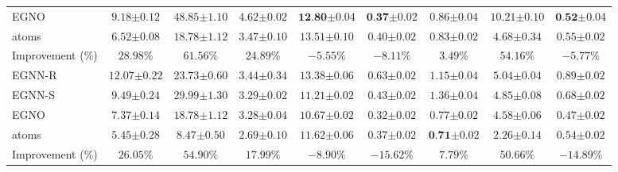 \begin{table}[ht]
{\begin{tabular}{lcccccccc}
        EGNO \cite{xu_equivariant_2024} & \(9.18{\scriptstyle \pm0.12}\) & \(48.85{\scriptstyle \pm1.10}\) & \(4.62{\scriptstyle \pm0.02}\) & \(\textbf{12.80}{\scriptstyle \pm0.04}\) & \(\textbf{0.37}{\scriptstyle \pm0.02}\) & \(0.86{\scriptstyle \pm0.04}\) & \(10.21{\scriptstyle \pm0.10}\) & \(\textbf{0.52}{\scriptstyle \pm0.04}\) \\
        \gls{atoms} & \(\mathbf{6.52}{\scriptstyle \pm0.08}\) & \(\mathbf{18.78}{\scriptstyle \pm1.12}\) & \(\mathbf{3.47}{\scriptstyle \pm0.10}\) & \(13.51{\scriptstyle \pm0.10}\) & \(0.40{\scriptstyle \pm0.02}\) & \(\mathbf{0.83}{\scriptstyle \pm0.02}\) & \(\mathbf{4.68}{\scriptstyle \pm0.34}\) & \(0.55{\scriptstyle \pm0.02}\) \\
        \midrule
        \rowcolor{gray!20} Improvement (\%) & \(28.98\%\) & \(61.56\%\) & \(24.89\%\) & \(-5.55\%\) & \(-8.11\%\) & \(3.49\%\) & \(54.16\%\) & \(-5.77\%\) \\
        \midrule
    
        EGNN-R & \(12.07{\scriptstyle \pm0.22}\) & \(23.73{\scriptstyle \pm0.60}\) & \(3.44{\scriptstyle \pm0.34}\) & \(13.38{\scriptstyle \pm0.06}\) & \(0.63{\scriptstyle \pm0.02}\) & \(1.15{\scriptstyle \pm0.04}\) & \(5.04{\scriptstyle \pm0.04}\) & \(0.89{\scriptstyle \pm0.02}\) \\
        EGNN-S & \(9.49{\scriptstyle \pm0.24}\) & \(29.99{\scriptstyle \pm1.30}\) & \(3.29{\scriptstyle \pm0.02}\) & \(11.21{\scriptstyle \pm0.02}\) & \(0.43{\scriptstyle \pm0.02}\) & \(1.36{\scriptstyle \pm0.04}\) & \(4.85{\scriptstyle \pm0.08}\) & \(0.68{\scriptstyle \pm0.02}\) \\
        
    
        EGNO & \(7.37{\scriptstyle \pm0.14}\) & \(18.78{\scriptstyle \pm1.12}\) & \(3.28{\scriptstyle \pm0.04}\) & \(\mathbf{10.67}{\scriptstyle \pm0.02}\) & \(\mathbf{0.32}{\scriptstyle \pm0.02}\) & \(0.77{\scriptstyle \pm0.02}\) & \(4.58{\scriptstyle \pm0.06}\) & \(\mathbf{0.47}{\scriptstyle \pm0.02}\) \\
        \gls{atoms} & \(\mathbf{5.45}{\scriptstyle \pm0.28}\) & \(\mathbf{8.47}{\scriptstyle \pm0.50}\) & \(\mathbf{2.69}{\scriptstyle \pm0.10}\) & \(11.62{\scriptstyle \pm0.06}\) & \(0.37{\scriptstyle \pm0.02}\) & \(\textbf{0.71}{\scriptstyle \pm0.02}\) & \(\mathbf{2.26}{\scriptstyle \pm0.14}\) & \(0.54{\scriptstyle \pm0.02}\) \\
        \midrule
        \rowcolor{gray!20} Improvement (\%) & \(26.05\%\) & \(54.90\%\) & \(17.99\%\) & \(-8.90\%\) & \(-15.62\%\) & \(7.79\%\) & \(50.66\%\) & \(-14.89\%\) \\
        \bottomrule
    \end{tabular}
    }
\end{table}

